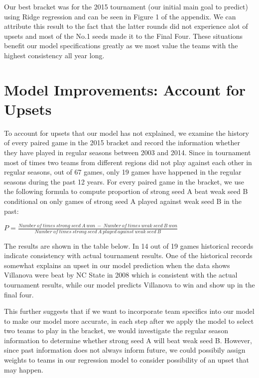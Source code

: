 \documentclass{article} %
\begin{document}
Our best bracket was for the 2015 tournament (our initial main goal to predict) using Ridge regression and can be seen in Figure 1 of the appendix. We can attribute this result to the fact that the latter rounds did not experience alot of upsets and most of the No.1 seeds made it to the Final Four. These situations benefit our model specifications greatly as we most value the teams with the highest consistency all year long.

\section{Model Improvements: Account for Upsets}

To account for upsets that our model has not explained, we examine the history of every paired game in the 2015 bracket and record the information whether they have played in regular seasons between 2003 and 2014. Since in tournament most of times two teams from different regions did not play against each other in regular seasons, out of 67 games, only 19 games have happened in the regular seasons during the past 12 years. For every paired game in the bracket, we use the following formula to compute proportion of strong seed A beat weak seed B conditional on only games of strong seed A played against weak seed B in the past:

$P=\frac{Number \ of \ times \ strong \ seed \ A \ won \ - \ Number \ of \ times \ weak \ seed \ B \ won}{Number \ of \ times \ strong \ seed \ A \ played \ against \ weak \ seed \ B }$


The results are shown in the table below. In 14 out of 19 games historical records indicate consistency with actual tournament results. One of the historical records somewhat explains an upset in our model prediction when the data shows Villanova were beat by NC State in 2008 which is consistent with the actual tournament results, while our model predicts Villanova to win and show up in the final four. 

This further suggests that if we want to incorporate team specifics into our model to make our model more accurate, in each step after we apply the model to select two teams to play in the bracket, we would investigate the regular season information to determine whether strong seed A will beat weak seed B. However, since past information does not always inform future, we could possibily assign weights to teams in our regression model to consider possibility of an upset that may happen. 
\end{document}
